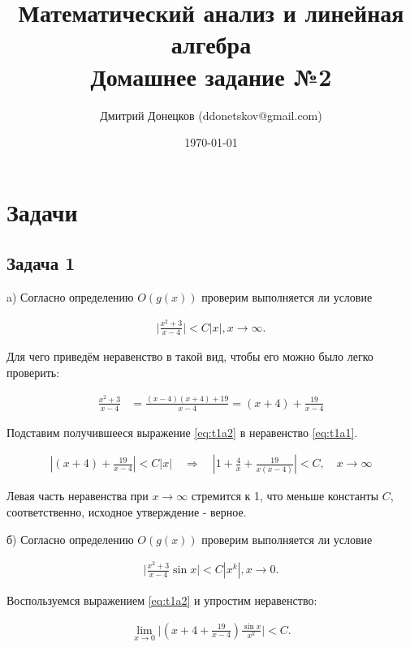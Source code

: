 \documentclass[a4paper,11pt]{article}
\title{\vspace{-1.5cm}Математический анализ и линейная алгебра \\
Домашнее задание №2}
\author{Дмитрий Донецков (ddonetskov@gmail.com)}
\date{\today}
\begin{document}
\maketitle

\section{Задачи}

\subsection{Задача 1}

a) Согласно определению $O(g(x))$ проверим выполняется ли условие

\begin{align}
\label{eq:t1a1}
\bigg\lvert \frac{x^2 + 3}{x - 4} \bigg\rvert < C|x|, x \rightarrow \infty.
\end{align}

Для чего приведём неравенство в такой вид, чтобы его можно было легко проверить:

\begin{align}
\label{eq:t1a2}
\frac{x^2 + 3}{x - 4} & = \frac{(x-4)(x+4) + 19}{x - 4} = (x+4) + \frac{19}{x-4}
\end{align}

Подставим получившееся выражение \ref{eq:t1a2} в неравенство \ref{eq:t1a1}.

\begin{align*}
|(x+4) + \frac{19}{x-4}| < C|x| 
\quad \Rightarrow \quad 
|1 + \frac{4}{x} + \frac{19}{x(x-4)}| < C, \quad x \rightarrow \infty
\end{align*}

Левая часть неравенства при $x \rightarrow \infty$ стремится к 1, что меньше константы $C$, соответственно, исходное утверждение - верное.

\bigskip

б) Согласно определению $O(g(x))$ проверим выполняется ли условие

\begin{align*}
\bigg\lvert \frac{x^2 + 3}{x - 4} \sin x \bigg\rvert < C|x^k|, x \rightarrow 0.
\end{align*}

Воспользуемся выражением \ref{eq:t1a2} и упростим неравенство:

\begin{align*}
\lim\limits_{x \rightarrow 0} \bigg\lvert (x+4 + \frac{19}{x-4}) \frac{\sin x}{x^k}\bigg\rvert < C.
\end{align*}
\end{document}
